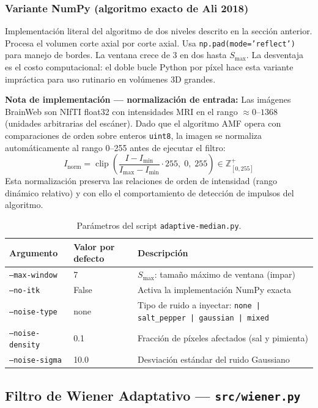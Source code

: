 \documentclass[12pt, a4paper]{article}
\begin{document}
\subsubsection{Variante NumPy (algoritmo exacto de Ali 2018)}

Implementación literal del algoritmo de dos niveles descrito en la sección anterior.
Procesa el volumen corte axial por corte axial. Usa \texttt{np.pad(mode='reflect')} para
manejo de bordes. La ventana crece de 3 en dos hasta $S_{\max}$. La desventaja es el
costo computacional: el doble bucle Python por píxel hace esta variante impráctica para
uso rutinario en volúmenes 3D grandes.

\textbf{Nota de implementación — normalización de entrada:} Las imágenes BrainWeb son
NIfTI float32 con intensidades MRI en el rango $\approx 0$–$1368$ (unidades arbitrarias
del escáner). Dado que el algoritmo AMF opera con comparaciones de orden sobre enteros
\texttt{uint8}, la imagen se normaliza automáticamente al rango 0–255 antes de ejecutar
el filtro:
\[
  I_{\text{norm}} = \operatorname{clip}\!\left(
    \frac{I - I_{\min}}{I_{\max} - I_{\min}} \cdot 255,\; 0,\; 255
  \right) \in \mathbb{Z}^+_{[0,255]}
\]
Esta normalización preserva las relaciones de orden de intensidad (rango dinámico relativo)
y con ello el comportamiento de detección de impulsos del algoritmo.

\begin{table}[H]
\centering
\renewcommand{\arraystretch}{1.3}
\begin{tabular}{llp{6.5cm}}
\toprule
\textbf{Argumento} & \textbf{Valor por defecto} & \textbf{Descripción} \\
\midrule
\texttt{--max-window} & 7 & $S_{\max}$: tamaño máximo de ventana (impar) \\
\texttt{--no-itk} & False & Activa la implementación NumPy exacta \\
\texttt{--noise-type} & none & Tipo de ruido a inyectar: \texttt{none | salt\_pepper | gaussian | mixed} \\
\texttt{--noise-density} & 0.1 & Fracción de píxeles afectados (sal y pimienta) \\
\texttt{--noise-sigma} & 10.0 & Desviación estándar del ruido Gaussiano \\
\bottomrule
\end{tabular}
\caption{Parámetros del script \texttt{adaptive-median.py}.}
\end{table}

\subsection{Filtro de Wiener Adaptativo — \texttt{src/wiener.py}}
\end{document}

